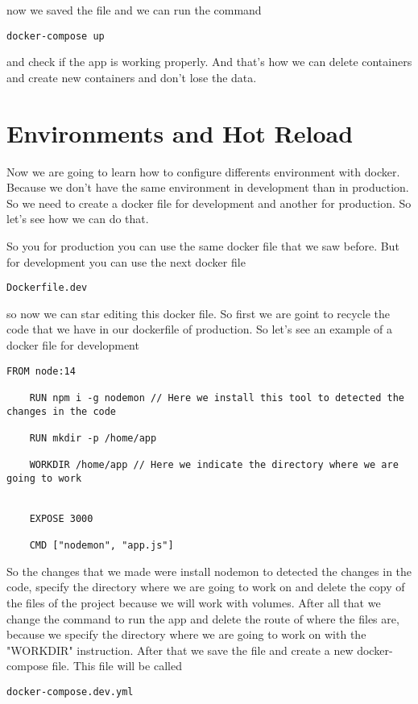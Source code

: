 \documentclass{article}
\begin{document}
now we saved the file and we can run the command
\begin{lstlisting}[breaklines=true, breakatwhitespace=true]
    docker-compose up
\end{lstlisting}

and check if the app is working properly. And that's how we can delete containers and create new containers and  don't lose the data.
          
\section*{Environments and Hot Reload}

Now we are going to learn how to configure differents environment with docker. Because we don't have the same environment in development 
than in production. So we need to create a docker file for development and another for production. So let's see how we can do that. 

So you for production you can use the same docker file that we saw before. But for development you can use the next docker file
\begin{lstlisting}[breaklines=true, breakatwhitespace=true]
   Dockerfile.dev
\end{lstlisting}

so now we can star editing this docker file. So first we are goint to recycle the code that we have in 
our dockerfile of production. So let's see an example of a docker file for development
\begin{lstlisting}[breaklines=true, breakatwhitespace=true]
    FROM node:14 

    RUN npm i -g nodemon // Here we install this tool to detected the changes in the code 

    RUN mkdir -p /home/app  
    
    WORKDIR /home/app // Here we indicate the directory where we are going to work

    
    EXPOSE 3000 

    CMD ["nodemon", "app.js"]

\end{lstlisting}

So the changes that we made were install nodemon to detected the changes in the code, specify the directory where we are 
going to work on and delete the copy of the files of the project because we will work with volumes. After all that we change 
the command to run the app and delete the route of where the files are, because we specify the directory where we are going 
to work on with the "WORKDIR" instruction. After that we save the file and create a new docker-compose file. This file will 
be called 
\begin{lstlisting}[breaklines=true, breakatwhitespace=true]
    docker-compose.dev.yml
\end{lstlisting}
\end{document}
